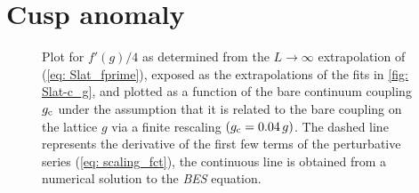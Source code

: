 \section{Cusp anomaly}\label{sec: res_cusp}
%
%
%
\begin{figure}[ht!]
\centering

\caption{Plot for $f'(g)/4$ as determined from the $L\to\infty$ extrapolation of (\ref{eq: Slat_fprime}), exposed as the extrapolations of the fits in \autoref{fig: Slat-c_g}, and plotted as a function of the bare continuum coupling $g_{\rm c}$ under the assumption that it is related to the bare coupling on the lattice $g$ via a finite rescaling $(g_{\rm c}=0.04\, g)$. The dashed line represents the derivative of the first few terms of the perturbative series (\ref{eq: scaling_fct}), the continuous line is obtained from a numerical solution to the \textit{BES} equation.
\label{fig: f_prime_Lm4}}
\end{figure}
%
%
